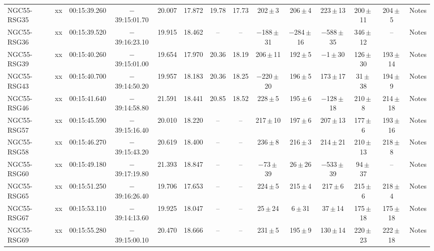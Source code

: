 \begin{table}
\begin{threeparttable}
\begin{tabular}{lrcccccccccccl}
NGC55-RSG35 & xx & 00:15:39.260 & $-$39:15:01.70& 20.007 & 17.872 &19.78 & 17.73 &   202\,$\pm$\,3  &  206\,$\pm$\,4   &    223\,$\pm$\,13 &   200\,$\pm$\,11              & 204\,$\pm$\,5  & Notes\\
NGC55-RSG36 & xx & 00:15:39.520 & $-$39:16:23.10& 19.915 & 18.462 & --   & --    &$-$188\,$\pm$\,31 &$-$284\,$\pm$\,16 & $-$588\,$\pm$\,35 &   346\,$\pm$\,12              & --             & Notes\\
NGC55-RSG39 & xx & 00:15:40.260 & $-$39:15:01.00& 19.654 & 17.970 &20.36 & 18.19 &   206\,$\pm$\,11 &  192\,$\pm$\,5&$-$1\,$\pm$\,30\tnote{c}& 126\,$\pm$\,30              & 193\,$\pm$\,14 & Notes\\
NGC55-RSG43 & xx & 00:15:40.700 & $-$39:14:50.20& 19.957 & 18.183 &20.36 & 18.25 &$-$220\,$\pm$\,20\tnote{c}&196\,$\pm$\,5& 173\,$\pm$\,17 &    31\,$\pm$\,38\tnote{c}     & 194\,$\pm$\,9  & Notes\\
NGC55-RSG46 & xx & 00:15:41.640 & $-$39:14:58.80& 21.591 & 18.441 &20.85 & 18.52 &   228\,$\pm$\,5  &  195\,$\pm$\,6   &  $-$128\,$\pm$\,18\tnote{c} &   210\,$\pm$\,8     & 214\,$\pm$\,18 & Notes\\
NGC55-RSG57 & xx & 00:15:45.590 & $-$39:15:16.40& 20.010 & 18.220 & --   & --    &   217\,$\pm$\,10 &  197\,$\pm$\,6   &     207\,$\pm$\,13 &   177\,$\pm$\,6              & 193\,$\pm$\,16 & Notes\\
NGC55-RSG58 & xx & 00:15:46.270 & $-$39:15:43.20& 20.619 & 18.400 & --   & --    &   236\,$\pm$\,8  &  216\,$\pm$\,3   &     214\,$\pm$\,21 &   210\,$\pm$\,13             & 218\,$\pm$\,8  & Notes\\
NGC55-RSG60 & xx & 00:15:49.180 & $-$39:17:19.80& 21.393 & 18.847 & --   & --    & $-$73\,$\pm$\,39 &   26\,$\pm$\,26  &  $-$533\,$\pm$\,39 &    94\,$\pm$\,37             & --             & Notes\\
NGC55-RSG65 & xx & 00:15:51.250 & $-$39:16:26.40& 19.706 & 17.653 & --   & --    &   224\,$\pm$\,5  &  215\,$\pm$\,4   &     217\,$\pm$\,6  &   215\,$\pm$\,6              & 218\,$\pm$\,4  & Notes\\
NGC55-RSG67 & xx & 00:15:53.110 & $-$39:14:13.60& 19.925 & 18.047 & --   & --    &25\,$\pm$\,24\tnote{c} & 6\,$\pm$\,31\tnote{c}&37\,$\pm$\,14\tnote{c} &175\,$\pm$\,18    & 175\,$\pm$\,18 & Notes\\
NGC55-RSG69 & xx & 00:15:55.280 & $-$39:15:00.10& 20.470 & 18.666 & --   & --    &   231\,$\pm$\,5  &  195\,$\pm$\,9   &130\,$\pm$\,14\tnote{c}&220\,$\pm$\,23             & 222\,$\pm$\,18 & Notes\\

\end{tabular}
\end{threeparttable}
\end{table}
